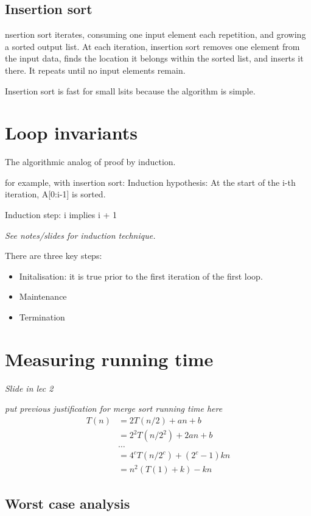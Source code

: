 \hypertarget{insertion-sort}{%
\subsection{Insertion sort}\label{insertion-sort}}

nsertion sort iterates, consuming one input element each repetition, and
growing a sorted output list. At each iteration, insertion sort removes
one element from the input data, finds the location it belongs within
the sorted list, and inserts it there. It repeats until no input
elements remain.

Insertion sort is fast for small lsits because the algorithm is simple.

\hypertarget{loop-invariants}{%
\section{Loop invariants}\label{loop-invariants}}

The algorithmic analog of proof by induction.

for example, with insertion sort: Induction hypothesis: At the start of
the i-th iteration, A[0:i-1] is sorted.

Induction step: i implies i + 1

\emph{See notes/slides for induction technique.}

There are three key steps: 

\begin{itemize}
	\item Initalisation: it is true prior to the
first iteration of the first loop. 
	\item Maintenance 
	\item Termination
\end{itemize}

\hypertarget{measuring-running-time}{%
\section{Measuring running time}\label{measuring-running-time}}

\emph{Slide in lec 2}

\emph{put previous justification for merge sort running time here}
\begin{align*}
	T(n) &= 2 T(n/2) + an + b\\&= 2^2 T(n/2^2) + 2an+b \\&\ldots{} \\&= 4^{c} 
	T(n/2^c) + (2^c - 1)kn\\& = n^2 ( T(1) + k ) - kn
\end{align*}


\hypertarget{worst-case-analysis}{%
\subsection{Worst case analysis}\label{worst-case-analysis}}
